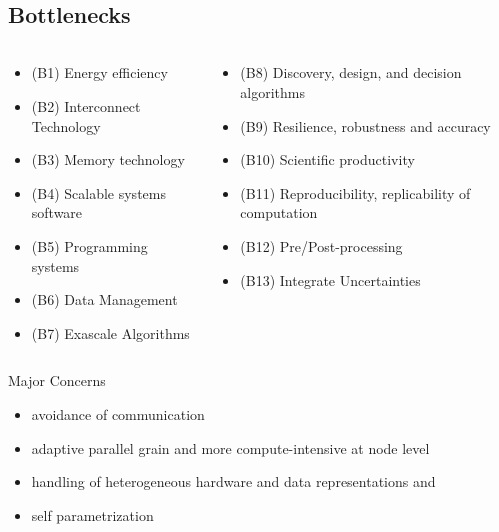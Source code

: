 \subsection{Bottlenecks}
\begin{frame}[fragile=singleslide]{\insertsectionhead}
  \framesubtitle{\insertsubsectionhead}
  \scriptsize
  \begin{columns}[]
    \begin{column}{.5\linewidth}
      \begin{itemize}
        \item (B1) Energy efficiency
        \item (B2) Interconnect Technology
        \item (B3) Memory technology
        \item (B4) Scalable systems software
        \item (B5) Programming systems
        \item (B6) Data Management
        \item (B7) Exascale Algorithms
      \end{itemize}
    \end{column}
    \begin{column}{.5\linewidth}
      \begin{itemize}
        \item (B8) Discovery, design, and decision algorithms
        \item (B9) Resilience, robustness and accuracy
        \item (B10) Scientific productivity
        \item (B11) Reproducibility, replicability of computation
        \item (B12) Pre/Post-processing
        \item (B13) Integrate Uncertainties
      \end{itemize}
    \end{column}
  \end{columns}
  \begin{alertblock}{Major Concerns}
    \footnotesize
    \begin{itemize}
      \item avoidance of communication  
      \item adaptive parallel grain and more compute-intensive at node level 
      \item handling of heterogeneous hardware and data representations and 
      \item self parametrization
    \end{itemize}
  \end{alertblock}
  
\end{frame}

